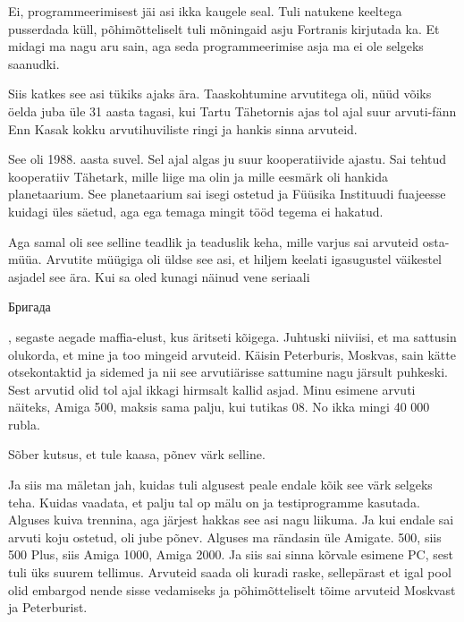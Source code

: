 Ei, programmeerimisest jäi asi ikka kaugele seal. Tuli natukene keeltega pusserdada küll,  põhimõtteliselt tuli mõningaid asju Fortranis kirjutada ka. Et midagi ma nagu aru sain, aga seda programmeerimise asja ma ei ole selgeks saanudki. 

Siis katkes see asi tükiks ajaks ära. Taaskohtumine arvutitega oli, nüüd võiks öelda juba üle 31 aasta tagasi, kui Tartu Tähetornis ajas tol ajal suur arvuti-fänn Enn Kasak kokku arvutihuviliste ringi ja hankis sinna arvuteid.


See oli 1988. aasta suvel. Sel ajal algas ju suur kooperatiivide ajastu. Sai tehtud kooperatiiv Tähetark, mille liige ma olin ja mille eesmärk oli hankida planetaarium. See planetaarium sai isegi ostetud ja  Füüsika Instituudi fuajeesse kuidagi üles säetud, aga ega temaga mingit tööd tegema ei hakatud. 

Aga samal oli see selline teadlik ja teaduslik keha,  mille varjus sai arvuteid osta-müüa. Arvutite müügiga oli üldse see asi, et hiljem keelati igasugustel väikestel asjadel see ära. Kui sa oled kunagi näinud vene seriaali \begin{russian}Бригада\end{russian}, segaste aegade maffia-elust, kus äritseti kõigega. Juhtuski niiviisi, et ma sattusin  olukorda, et mine ja too mingeid arvuteid. Käisin Peterburis, Moskvas, sain kätte otsekontaktid ja sidemed ja nii see arvutiärisse sattumine nagu järsult puhkeski. Sest arvutid olid tol ajal ikkagi hirmsalt kallid asjad. Minu esimene arvuti näiteks, Amiga 500,  maksis sama palju, kui tutikas 08. No ikka mingi 40 000 rubla.
                 

Sõber kutsus, et tule kaasa, põnev värk selline.

Ja siis ma mäletan jah, kuidas tuli algusest peale endale kõik see värk selgeks teha. Kuidas vaadata, et palju tal op mälu on ja testiprogramme kasutada. Alguses kuiva trennina, aga järjest hakkas see asi nagu liikuma. Ja kui endale sai arvuti koju ostetud,  oli jube põnev. Alguses ma rändasin  üle Amigate.  500, siis 500 Plus, siis Amiga 1000, Amiga 2000. Ja siis sai sinna kõrvale esimene PC, sest tuli üks suurem tellimus. Arvuteid saada oli kuradi raske, sellepärast et igal pool olid embargod nende sisse vedamiseks ja  põhimõtteliselt tõime arvuteid Moskvast ja Peterburist.\label{sisu!veiko_moskvas}

